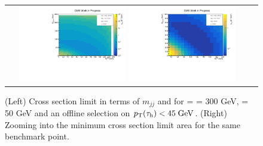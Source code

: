 \begin{figure}[tbh!]
	\centering
	\begin{tabular}{cc}
		\includegraphics[width=0.45\textwidth]{analysis/pics/JetInvMass_vs_MET_xsec_chi300_lsp050_taupt45.pdf}
		\includegraphics[width=0.45\textwidth]{analysis/pics/JetInvMass_vs_MET_xsec_chi300_lsp050_taupt45_zoom.pdf} 		
	\end{tabular}
	\caption{(Left) Cross section limit in terms of $m_{jj}$ and \met for \charginopm = \neutralinotwo = 300 GeV, \neutralinoone = 50 GeV and an offline selection on $p_{\text{T}}(\tau_{\text{h}}) <  45\;\text{Ge}\kern-0.06667em\text{V}$. (Right) Zooming into the minimum cross section limit area for the same benchmark point.}
	\label{fig::JetInvMass_vs_MET_xsec_chi300_lsp050_taupt45}
\end{figure}

\clearpage

